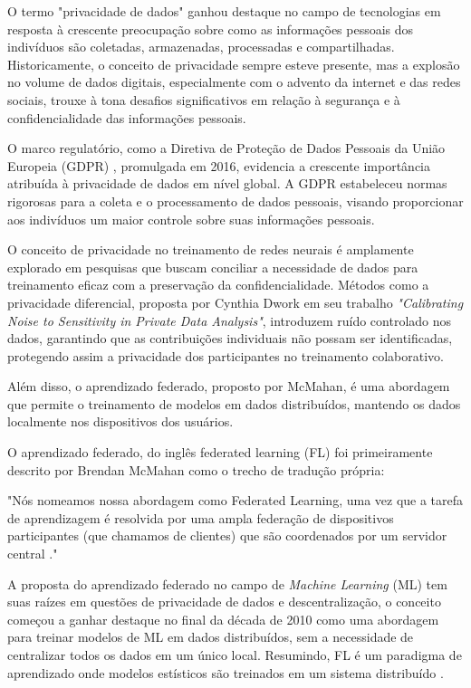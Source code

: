 O termo "privacidade de dados" ganhou destaque no campo de tecnologias em resposta à crescente preocupação sobre como as informações pessoais dos indivíduos são coletadas, armazenadas, processadas e compartilhadas. Historicamente, o conceito de privacidade sempre esteve presente, mas a explosão no volume de dados digitais, especialmente com o advento da internet e das redes sociais, trouxe à tona desafios significativos em relação à segurança e à confidencialidade das informações pessoais.

O marco regulatório, como a Diretiva de Proteção de Dados Pessoais da União Europeia (GDPR) \cite{GDPR}, promulgada em 2016, evidencia a crescente importância atribuída à privacidade de dados em nível global. A GDPR estabeleceu normas rigorosas para a coleta e o processamento de dados pessoais, visando proporcionar aos indivíduos um maior controle sobre suas informações pessoais.

O conceito de privacidade no treinamento de redes neurais é amplamente explorado em pesquisas que buscam conciliar a necessidade de dados para treinamento eficaz com a preservação da confidencialidade. Métodos como a privacidade diferencial, proposta por Cynthia Dwork em seu trabalho \textit{"Calibrating Noise to Sensitivity in Private Data Analysis"}\cite{dwork2006calibrating}, introduzem ruído controlado nos dados, garantindo que as contribuições individuais não possam ser identificadas, protegendo assim a privacidade dos participantes no treinamento colaborativo.

Além disso, o aprendizado federado, proposto por McMahan\cite{mcmahan2017communication}, é uma abordagem que permite o treinamento de modelos em dados distribuídos, mantendo os dados localmente nos dispositivos dos usuários.

O aprendizado federado, do inglês federated learning (FL) foi primeiramente descrito por Brendan McMahan como o trecho de tradução própria:

\begin{citacao}
"Nós nomeamos nossa abordagem como Federated Learning, uma vez que a tarefa de aprendizagem é resolvida por uma ampla federação de dispositivos participantes (que chamamos de clientes) que são coordenados por um servidor central \cite{mcmahan2017communication}."
\end{citacao}

A proposta do aprendizado federado no campo de \emph{Machine Learning} (ML) tem suas raízes em questões de privacidade de dados e descentralização, o conceito começou a ganhar destaque no final da década de 2010 como uma abordagem para treinar modelos de ML em dados distribuídos, sem a necessidade de centralizar todos os dados em um único local. Resumindo, FL é um paradigma de aprendizado onde modelos estísticos são treinados em um sistema distribuído \cite{li2020preserving}.

